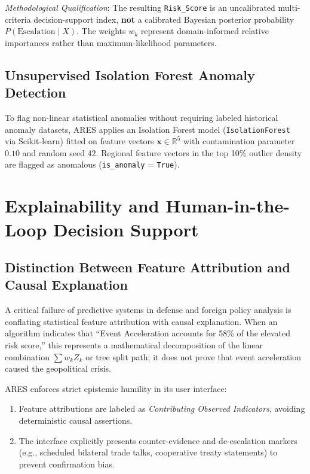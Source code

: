 \documentclass[preprint,12pt]{elsarticle}
\begin{document}
\emph{Methodological Qualification}: The resulting \texttt{Risk\_Score} is an uncalibrated multi-criteria decision-support index, \textbf{not} a calibrated Bayesian posterior probability $P(\text{Escalation} \mid X)$. The weights $w_k$ represent domain-informed relative importances rather than maximum-likelihood parameters.

\subsection{Unsupervised Isolation Forest Anomaly Detection}
To flag non-linear statistical anomalies without requiring labeled historical anomaly datasets, ARES applies an Isolation Forest model (\texttt{IsolationForest}~\cite{liu2008isolation} via Scikit-learn) fitted on feature vectors $\mathbf{x} \in \mathbb{R}^5$ with contamination parameter $0.10$ and random seed $42$. Regional feature vectors in the top 10\% outlier density are flagged as anomalous (\texttt{is\_anomaly} = \texttt{True}).

\section{Explainability and Human-in-the-Loop Decision Support}
\label{sec:xai}

\subsection{Distinction Between Feature Attribution and Causal Explanation}
A critical failure of predictive systems in defense and foreign policy analysis is conflating statistical feature attribution with causal explanation. When an algorithm indicates that ``Event Acceleration accounts for 58\% of the elevated risk score,'' this represents a mathematical decomposition of the linear combination $\sum w_k Z_k$ or tree split path; it does not prove that event acceleration caused the geopolitical crisis.

ARES enforces strict epistemic humility in its user interface:
\begin{enumerate}
    \item Feature attributions are labeled as \emph{Contributing Observed Indicators}, avoiding deterministic causal assertions.
    \item The interface explicitly presents counter-evidence and de-escalation markers (e.g., scheduled bilateral trade talks, cooperative treaty statements) to prevent confirmation bias.
\end{enumerate}
\end{document}
